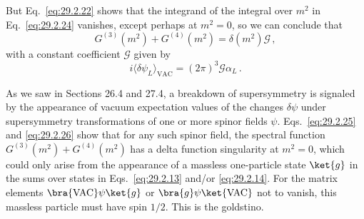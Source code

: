 But Eq.~\eqref{eq:29.2.22} shows that the integrand of the integral over
\(m^2\) in Eq.~\eqref{eq:29.2.24} vanishes, except perhaps at \(m^2=0\),
so we can conclude that
\begin{equation}
  G^{(3)}(m^2)+G^{(4)}(m^2)
  =\delta(m^2)\mathcal{G}\,,
  \tag{29.2.25}\label{eq:29.2.25}
\end{equation}
with a constant coefficient \(\mathcal{G}\) given by
\begin{equation}
  i\langle\delta\psi_L\rangle_{\mathrm{VAC}}
  =(2\pi)^3\mathcal{G}\alpha_L\,.
  \tag{29.2.26}\label{eq:29.2.26}
\end{equation}

As we saw in Sections 26.4 and 27.4, a breakdown of supersymmetry is
signaled by the appearance of vacuum expectation values of the changes
\(\delta\psi\) under supersymmetry transformations of one or more spinor
fields \(\psi\). Eqs.~\eqref{eq:29.2.25} and \eqref{eq:29.2.26} show that
for any such spinor field, the spectral function
\(G^{(3)}(m^2)+G^{(4)}(m^2)\) has a delta function singularity at
\(m^2=0\), which could only arise from the appearance of a massless
one-particle state \(\ket{g}\) in the sums over states in
Eqs.~\eqref{eq:29.2.13} and/or \eqref{eq:29.2.14}. For the matrix elements
\(\bra{\mathrm{VAC}}\psi\ket{g}\) or
\(\bra{g}\psi\ket{\mathrm{VAC}}\) not to vanish, this
massless particle must have spin \(1/2\). This is the goldstino.

